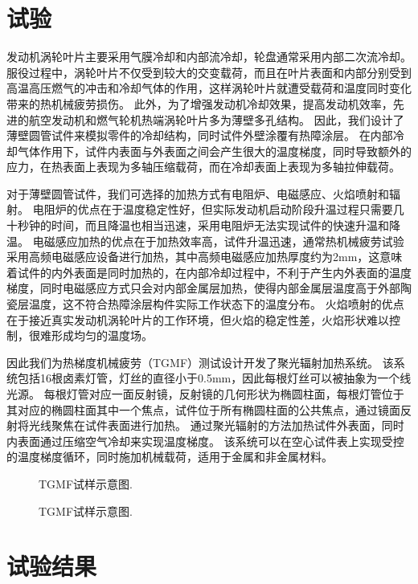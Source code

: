 \section{试验}
发动机涡轮叶片主要采用气膜冷却和内部流冷却，轮盘通常采用内部二次流冷却。
服役过程中，涡轮叶片不仅受到较大的交变载荷，而且在叶片表面和内部分别受到高温高压燃气的冲击和冷却气体的作用，这样涡轮叶片就遭受载荷和温度同时变化带来的热机械疲劳损伤。
此外，为了增强发动机冷却效果，提高发动机效率，先进的航空发动机和燃气轮机热端涡轮叶片多为薄壁多孔结构。
因此，我们设计了薄壁圆管试件来模拟零件的冷却结构，同时试件外壁涂覆有热障涂层。
在内部冷却气体作用下，试件内表面与外表面之间会产生很大的温度梯度，同时导致额外的应力，在热表面上表现为多轴压缩载荷，而在冷却表面上表现为多轴拉伸载荷。

对于薄壁圆管试件，我们可选择的加热方式有电阻炉、电磁感应、火焰喷射和辐射。
电阻炉的优点在于温度稳定性好，但实际发动机启动阶段升温过程只需要几十秒钟的时间，而且降温也相当迅速，采用电阻炉无法实现试件的快速升温和降温。
电磁感应加热的优点在于加热效率高，试件升温迅速，通常热机械疲劳试验采用高频电磁感应设备进行加热，其中高频电磁感应加热厚度约为2mm，这意味着试件的内外表面是同时加热的，在内部冷却过程中，不利于产生内外表面的温度梯度，同时电磁感应方式只会对内部金属层加热，使得内部金属层温度高于外部陶瓷层温度，这不符合热障涂层构件实际工作状态下的温度分布。
火焰喷射的优点在于接近真实发动机涡轮叶片的工作环境，但火焰的稳定性差，火焰形状难以控制，很难形成均匀的温度场。

因此我们为热梯度机械疲劳（TGMF）测试设计开发了聚光辐射加热系统。
该系统包括16根卤素灯管，灯丝的直径小于0.5mm，因此每根灯丝可以被抽象为一个线光源。
每根灯管对应一面反射镜，反射镜的几何形状为椭圆柱面，每根灯管位于其对应的椭圆柱面其中一个焦点，试件位于所有椭圆柱面的公共焦点，通过镜面反射将光线聚焦在试件表面进行加热。
通过聚光辐射的方法加热试件外表面，同时内表面通过压缩空气冷却来实现温度梯度。
该系统可以在空心试件表上实现受控的温度梯度循环，同时施加机械载荷，适用于金属和非金属材料。


\begin{figure}[!htp]
\caption{TGMF试样示意图.}
\label{Fig:Radiation_Furnace2}
\end{figure}

\begin{figure}[!htp]
\caption{TGMF试样示意图.}
\label{Fig:Specimen}
\end{figure}
\section{试验结果}

